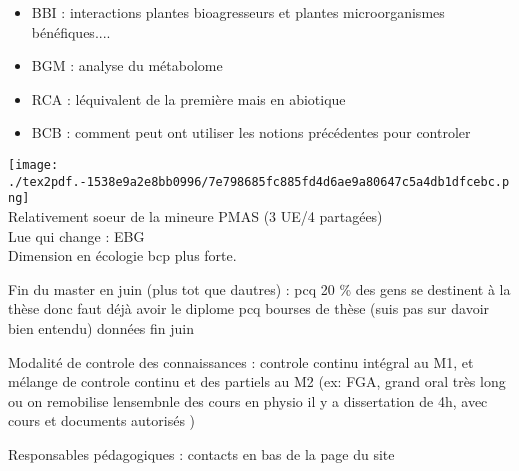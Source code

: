 \documentclass[
]{article}
\providecommand{\tightlist}{%
  \setlength{\itemsep}{0pt}\setlength{\parskip}{0pt}}
\begin{document}
\begin{itemize}
\tightlist
\item
  BBI : interactions plantes bioagresseurs et plantes microorganismes
  bénéfiques....
\item
  BGM : analyse du métabolome
\item
  RCA : l\textquotesingle équivalent de la première mais en abiotique
\item
  BCB : comment peut ont utiliser les notions précédentes pour controler
\end{itemize}

\texttt{[image: ./tex2pdf.-1538e9a2e8bb0996/7e798685fc885fd4d6ae9a80647c5a4db1dfcebc.png]}\\
Relativement soeur de la mineure PMAS (3 UE/4 partagées)\\
L\textquotesingle ue qui change : EBG\\
Dimension en écologie bcp plus forte.

Fin du master en juin (plus tot que d\textquotesingle autres) : pcq 20
\% des gens se destinent à la thèse donc faut déjà avoir le diplome pcq
bourses de thèse (suis pas sur d\textquotesingle avoir bien entendu)
données fin juin

Modalité de controle des connaissances : controle continu intégral au
M1, et mélange de controle continu et des partiels au M2 (ex: FGA, grand
oral très long ou on remobilise l\textquotesingle ensembnle des cours
\textbar{} en physio il y a dissertation de 4h, avec cours et documents
autorisés )

Responsables pédagogiques : contacts en bas de la page du site
\end{document}

